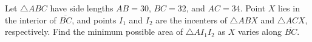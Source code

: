 Let \(\triangle ABC\) have side lengths \(AB=30\),  \(BC=32\),  and \(AC=34\). Point \(X\) lies in the interior of \(\overline{BC}\),  and points \(I_1\) and \(I_2\) are the incenters of \(\triangle ABX\) and \(\triangle ACX\),  respectively. Find the minimum possible area of \(\triangle AI_1I_2\) as \( X\) varies along \(\overline{BC}\).